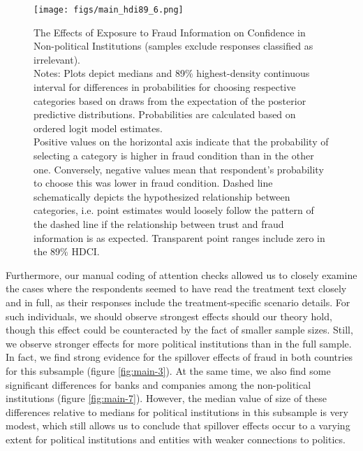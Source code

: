 \documentclass[11pt, ngerman,english,a4]{article}
\begin{document}
\begin{figure}[H]
	\centering
	\texttt{[image: figs/main\_hdi89\_6.png]}
	\caption{The Effects of Exposure to Fraud Information on Confidence in Non-political Institutions (samples exclude responses classified as irrelevant).  \\
		\footnotesize{Notes: Plots depict medians and 89\% highest-density continuous interval for differences in probabilities for choosing respective categories based on draws from the expectation of the posterior predictive distributions. Probabilities are calculated based on ordered logit model estimates.\\
			Positive values on the horizontal axis indicate that the probability of selecting a category is higher in fraud condition than in the other one. Conversely, negative values mean that respondent's probability to choose this was lower in fraud condition. Dashed line schematically depicts the hypothesized relationship between categories, i.e. point estimates would loosely follow the pattern of the dashed line if the relationship between trust and fraud information is as expected. Transparent point ranges include zero in the 89\% HDCI.\\
	} }
	\singlespacing
	\raggedright
	\label{fig:main-6}
\end{figure}
    
    
\clearpage

Furthermore, our manual coding of attention checks allowed us to closely examine the cases where the respondents seemed to have read the treatment text closely and in full, as their responses include the treatment-specific scenario details. For such individuals, we should observe strongest effects should our theory hold, though this effect could be counteracted by the fact of smaller sample sizes. Still, we observe stronger effects for more political institutions than in the full sample. In fact, we find strong evidence for the spillover effects of fraud in both countries for this subsample (figure \ref{fig:main-3}). At the same time, we also find some significant differences for banks and companies among the non-political institutions (figure \ref{fig:main-7}). However, the median value of size of these differences relative to medians for political institutions in this subsample is very modest, which still allows us to conclude that spillover effects occur to a varying extent for political institutions and entities with weaker connections to politics. 
\end{document}
